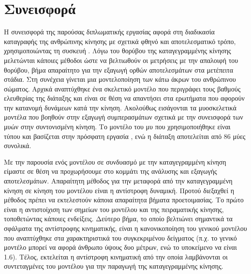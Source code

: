 \section{Συνεισφορά}

Η συνεισφορά της παρούσας διπλωματικής εργασίας αφορά στη διαδικασία καταγραφής της ανθρώπινης κίνησης με σχετικά φθηνό και αποτελεσματικό τρόπο, χρησιμοποιώντας τη συσκευή . Λόγω του θορύβου της καταγεγραμμένης κίνησης μελετώνται κάποιες μέθοδοι ώστε να βελτιωθούν οι μετρήσεις με την απαλοιφή του θορύβου, βήμα απαραίτητο για την εξαγωγή ορθών αποτελεσμάτων στα μετέπειτα στάδια. Στη συνέχεια γίνεται μια μοντελοποίηση των κάτω άκρων του ανθρώπινου σώματος. Αρχικά αναπτύχθηκε ένα σκελετικό μοντέλο που περιγράφει τους βαθμούς ελευθερίας της διάταξης και είναι σε θέση να απαντήσει στα ερωτήματα που αφορούν την κατανομή δυνάμεων κατά την κίνηση. Ακολούθως εισάγονται τα μυοσκελετικά μοντέλα που βοηθούν στην εξαγωγή συμπερασμάτων σχετικά με την συνεισφορά των μυών στην συντονισμένη κίνηση. Το μοντέλο του μυ που χρησιμοποιήθηκε είναι τύπου  και βασίζεται στην πρόσφατη εργασία \cite{millard13}, ενώ η διάταξη αποτελείται από 86 μύες συνολικά.

Με την παρουσία ενός μοντέλου σε συνδυασμό με την καταγεγραμμένη κίνηση είμαστε σε θέση να προχωρήσουμε στο κομμάτι της ανάλυσης και εξαγωγής αποτελεσμάτων. Απαραίτητη μέθοδος για την μεταφορά από την καταγεγραμμένη κίνηση σε κίνηση του μοντέλου είναι η αντίστροφη δυναμική. Προτού διεξαχθεί η μέθοδος πρέπει να εκτελεστούν κάποια απαραίτητα βήματα προετοιμασίας. Το πρώτο είναι η αντιστοίχιση των σημείων του μοντέλου και της πειραματικής κίνησης, τοποθετώντας κάποιες ενδείξεις. Δεύτερο βήμα, το οποίο βελτιώνει σημαντικά τα σφάλματα της αντίστροφης κινηματικής, είναι η κανονικοποίηση του γενικού μοντέλου που αναπτύχθηκε στα χαρακτηριστικά του συγκεκριμένου δείγματος (π.χ. το γενικό μοντέλο μπορεί να αφορά άνθρωπο ύψους δυο μέτρων, ενώ το υποκείμενο να είναι 1.6). Τέλος, εκτελείται η αντίστροφη κινηματική από την οποία λαμβάνονται οι συντεταγμένες του μοντέλου για την παραγωγή της καταγεγραμμένης κίνησης.

